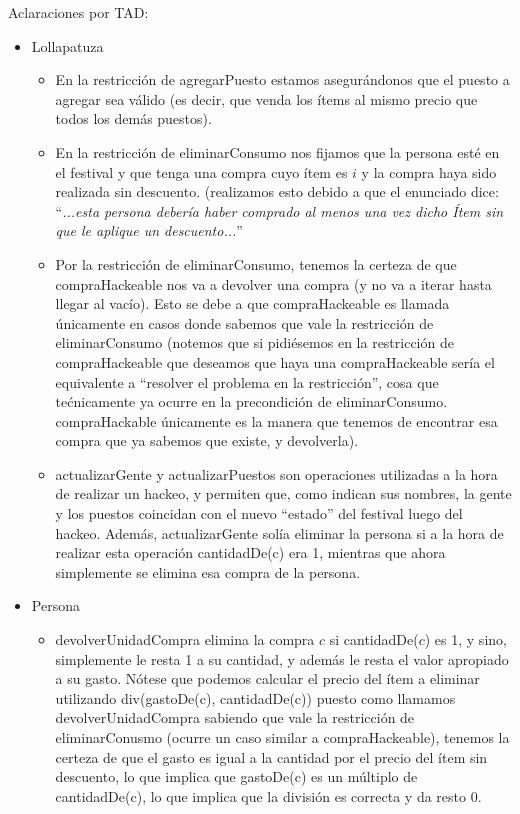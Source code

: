 \documentclass[10pt, a4paper]{article}
\begin{document}
{\noindent Aclaraciones por TAD:
\begin{itemize}
    \item Lollapatuza 
        \begin{itemize}
            \item En la restricción de agregarPuesto estamos asegurándonos que el puesto a agregar sea válido (es decir, que venda los 
            ítems al mismo precio que todos los demás puestos).
            \item En la restricción de eliminarConsumo nos fijamos que la persona esté en el festival y que tenga una compra cuyo ítem
            es $i$ y la compra haya sido realizada sin descuento. (realizamos esto debido a que el enunciado dice: ``\textit{...esta persona debería haber comprado al menos una vez dicho Ítem sin que le aplique un descuento...}''
            \item Por la restricción de eliminarConsumo, tenemos la certeza de que compraHackeable nos va a devolver una compra (y no
            va a iterar hasta llegar al vacío). Esto se debe a que compraHackeable es llamada únicamente en casos donde sabemos que vale
            la restricción de eliminarConsumo (notemos que si pidiésemos en la restricción de compraHackeable que deseamos que haya una
            compraHackeable sería el equivalente a ``resolver el problema en la restricción'', cosa que tećnicamente ya ocurre en la precondición de eliminarConsumo. compraHackable únicamente es la manera que tenemos de encontrar esa compra que ya sabemos
            que existe, y devolverla).
            \item actualizarGente y actualizarPuestos son operaciones utilizadas a la hora de realizar un hackeo, y permiten que, como
            indican sus nombres, la gente y los puestos coincidan con el nuevo ``estado'' del festival luego del hackeo. 
            Además, actualizarGente solía eliminar la persona si a la hora de realizar esta operación cantidadDe(c) era 1, mientras que 
            ahora simplemente se elimina esa compra de la persona.
        \end{itemize}

    \item Persona
        \begin{itemize}
            \item devolverUnidadCompra elimina la compra $c$ si cantidadDe($c$) es 1, y sino, simplemente le resta 1 a su cantidad, y
            además le resta el valor apropiado a su gasto. Nótese que podemos calcular el precio del ítem a eliminar utilizando
            div(gastoDe(c), cantidadDe(c)) puesto como llamamos devolverUnidadCompra sabiendo que vale la restricción de eliminarConusmo
            (ocurre un caso similar a compraHackeable), tenemos la certeza de que el gasto es igual a la cantidad por el precio del ítem
            sin descuento, lo que implica que gastoDe(c) es un múltiplo de cantidadDe(c), lo que implica que la división es correcta y 
            da resto 0.
        \end{itemize}


\end{itemize}}
\end{document}
